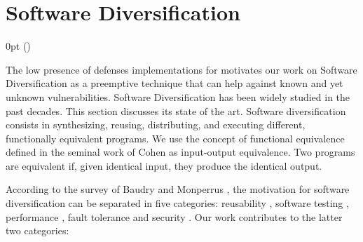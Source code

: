 \section{Software Diversification}
\label{sota:sota}
\def\checkmark{\tikz\fill[scale=0.4](0,.35) -- (.25,0) -- (1,.7) -- (.25,.15) -- cycle;} 

  {\topsep}%
  {\topsep}%
  {\itshape}%
  {0pt}%
  {\bfseries}%
  {}%
  { }%
  {()\textnormal{}}

\def\Gnospace~{G{}}
\theoremstyle{sota}
\newtheorem{goal}{G}
\providecommand*{\definitionautorefname}{\Gnospace}
\newcommand{\goalautorefname}{\Gnospace}


\def\Snospace~{S{}}
\theoremstyle{sota}
\newtheorem{strategy}{S}
\providecommand*{\definitionautorefname}{\Snospace}
\newcommand{\strategyautorefname}{\Snospace}

\def\Unospace~{U{}}
\theoremstyle{sota}
\newtheorem{usage}{U}
\providecommand*{\definitionautorefname}{\Unospace}
\newcommand{\usageautorefname}{\Unospace}

The low presence of defenses implementations for \wasm motivates our work on Software Diversification as a preemptive technique that can help against known and yet unknown vulnerabilities.
Software Diversification has been widely studied in the past decades. This section discusses its state of the art.
Software diversification consists in synthesizing, reusing, distributing, and executing different, functionally equivalent programs. We use the concept of functional equivalence defined in the seminal work of Cohen \etal \cite{cohen1993operating} as input-output equivalence. Two programs are equivalent if, given identical input, they produce the identical output.

According to the survey of Baudry and Monperrus \cite{natural_diversity}, the motivation for software diversification can be separated in five categories: reusability \cite{pohl2005software}, software testing \cite{Chen2010AdaptiveRT}, performance \cite{10.1145/2025113.2025133}, fault tolerance \cite{1659219} and security \cite{cohen1993operating}. Our work contributes to the latter two categories: 

